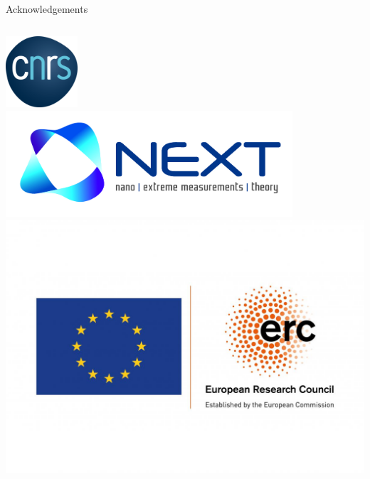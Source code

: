 \documentclass[aspectratio=169,9pt]{beamer}
\begin{document}
\begin{frame}{Acknowledgements}
\begin{columns}
\begin{column}{0.32\textwidth}
\begin{center}
                                \includegraphics[width=0.2\textwidth]{fig/CNRS}
                                \\
                                \includegraphics[width=0.8\textwidth]{fig/NEXT}
                                \\
                                \includegraphics[width=\textwidth]{fig/ERC}
                        \end{center}
                \end{column}
        \end{columns}
\end{frame}
\end{document}
